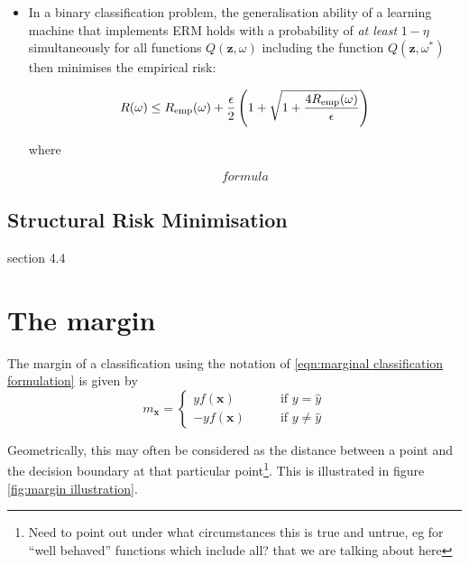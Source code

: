 \begin{itemize}

\item	In a binary classification problem, the generalisation ability
	of a learning machine that implements ERM holds with a
	probability of \emph{at least} $1-\eta$ simultaneously for
	all functions $Q(\mathbf{z}, \omega)$ including the function
	$Q(\mathbf{z}, \omega^*)$ then minimises the empirical risk:

	\begin{equation}
	R(\omega) \leq R_{\mathrm{emp}}(\omega) + \frac{\epsilon}{2} \left(
	1 + \sqrt{1 + \frac{4 R_{\mathrm{emp}}(\omega)}{\epsilon}} \right)
	\end{equation}

	where

	\begin{equation}
	formula
	\end{equation}

\end{itemize}


\subsection{Structural Risk Minimisation}
\cite{Cherkassky98} section 4.4







\section{The margin}
\label{sec:the margin}

The margin of a classification using the notation of \ref{eqn:marginal
classification formulation} is given by
%
\begin{equation}
m_{\mathbf{x}} = \left\{ \begin{array}{rl}
yf(\mathbf{x})	& \qquad \mbox{if $y = \hat{y}$} \\
-yf(\mathbf{x})	& \qquad \mbox{if $y \neq \hat{y}$}
\end{array} \right.
\label{eqn:margin definition}
\end{equation}

Geometrically, this may often be considered as the distance between a
point and the decision boundary at that particular point\footnote{Need
to point out under what circumstances this is true and untrue, eg for
``well behaved'' functions which include all? that we are talking
about here}.  This is illustrated in figure \ref{fig:margin
illustration}.


